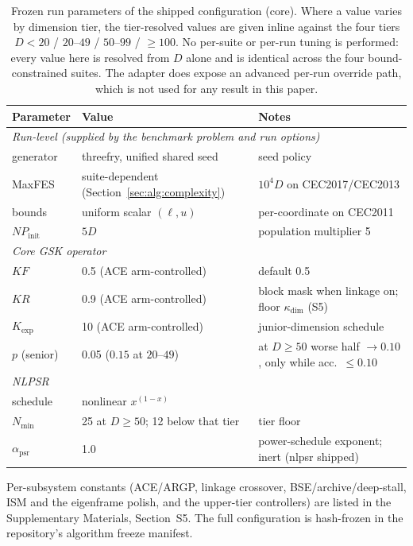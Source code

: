 \begin{table}[t]
\caption{Frozen run parameters of the shipped configuration (core).
Where a value varies by dimension tier, the tier-resolved values are given
inline against the four tiers $D{<}20$ / $20$--$49$ / $50$--$99$ / ${\ge}100$.
No per-suite or per-run tuning is performed: every value here is resolved from $D$ alone and is identical across the four bound-constrained suites. The adapter does expose an advanced per-run override path, which is not used for any result in this paper.}
\label{tab:parameters}
\centering
\small
\begin{tabular}{lll}
\toprule
\textbf{Parameter} & \textbf{Value} & \textbf{Notes}\\
\midrule
\multicolumn{3}{l}{\emph{Run-level (supplied by the benchmark problem and run options)}}\\
\midrule
generator & threefry, unified shared seed & seed policy\\
MaxFES & suite-dependent (Section~\ref{sec:alg:complexity}) & $10^4 D$ on CEC2017/CEC2013\\
bounds & uniform scalar $(\ell,u)$ & per-coordinate on CEC2011\\
$NP_{\text{init}}$ & $5D$ & population multiplier 5\\
\midrule
\multicolumn{3}{l}{\emph{Core GSK operator}}\\
\midrule
$KF$ & 0.5 (ACE arm-controlled) & default 0.5\\
$KR$ & 0.9 (ACE arm-controlled) & block mask when linkage on; floor $\kappa_{\dim}$ (S5)\\
$K_{\exp}$ & 10 (ACE arm-controlled) & junior-dimension schedule\\
$p$ (senior) & 0.05 ($0.15$ at $20$--$49$) & at $D\ge50$ worse half $\to0.10$, only while acc.\ ${\le}0.10$\\
\midrule
\multicolumn{3}{l}{\emph{NLPSR}}\\
\midrule
schedule & nonlinear $x^{(1-x)}$ & \\
$N_{\min}$ & 25 at $D\ge50$; 12 below that tier & tier floor\\
$\alpha_{\text{psr}}$ & 1.0 & power-schedule exponent; inert (nlpsr shipped)\\
\bottomrule
\end{tabular}

\vspace{2pt}
{\footnotesize Per-subsystem constants (ACE/ARGP, linkage crossover,
BSE/archive/deep-stall, ISM and the eigenframe polish, and the upper-tier
controllers) are listed in the Supplementary Materials, Section~S5. The
full configuration is hash-frozen in the repository's algorithm freeze
manifest.}
\end{table}
